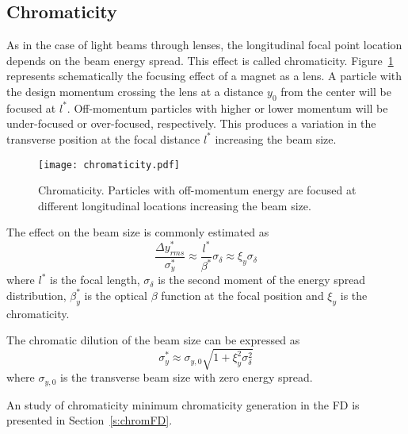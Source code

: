 \subsection{Chromaticity}
As in the case of light beams through lenses, the longitudinal focal point location depends on the beam energy spread. This effect is called chromaticity.  Figure~\ref{f:chrom} represents schematically the focusing effect of a magnet as a lens. A particle with the design momentum crossing the lens at a distance $y_0$ from the center will be focused at $l^*$. Off-momentum particles with higher or lower momentum will be under-focused or over-focused, respectively. This produces a variation in the transverse position at the focal distance $l^*$ increasing the beam size.\par
\begin{figure}[!hbt]
\centering
\texttt{[image: chromaticity.pdf]}\caption{Chromaticity. Particles with off-momentum energy are focused at different longitudinal locations increasing the beam size.}\label{f:chrom}
\end{figure}
The effect on the beam size is commonly estimated as
\begin{equation}
 \frac{\Delta y^*_{rms}}{\sigma^*_y}\approx\frac{l^*}{\beta^*}\sigma_\delta\approx\xi_y\sigma_\delta
\end{equation}
where $l^*$ is the focal length, $\sigma_\delta$ is the second moment of the energy spread distribution, $\beta_y^*$ is the optical $\beta$ function at the focal position and $\xi_y$ is the chromaticity.\par
The chromatic dilution of the beam size can be expressed as 
\begin{equation}
 \sigma^*_y\approx\sigma_{y,0}\sqrt{1+\xi_y^2\sigma^2_\delta}
\end{equation}
where $\sigma_{y,0}$ is the transverse beam size with zero energy spread.\par
An study of chromaticity minimum chromaticity generation in the FD is presented in Section~\ref{s:chromFD}.
